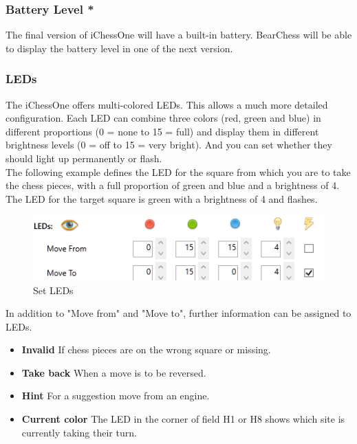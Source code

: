 \documentclass[11pt,a4paper]{article}
\begin{document}
\subsubsection{Battery Level {\color{red}\textbf{*}} }
 
The final version of iChessOne will have a built-in battery. BearChess will be able to display the battery level in one of the next version.

\subsubsection{LEDs}

The iChessOne offers multi-colored LEDs. This allows a much more detailed configuration. Each LED can combine three colors ({\color{red}red}, {\color{ForestGreen}green} and {\color{blue}blue}) in different proportions (0 = none to 15 = full) and display them in different brightness levels (0 = off to 15 = very bright).
And you can set whether they should light up permanently or flash.\\
The following example defines the LED for the square from which you are to take the chess pieces, with a full proportion of  {\color{ForestGreen}green} and {\color{blue}blue} and a brightness of 4.
The LED for the target square is {\color{ForestGreen}green} with a brightness of 4 and flashes.

\begin{figure}[H]
	\centering
	\includegraphics[scale=1.0]{iChessOne3.png}
	\caption{Set LEDs }
	\label{fig:iChessOne6}
\end{figure}
In addition to "Move from" and "Move to", further information can be assigned to LEDs.
\begin{itemize}
	\item \textbf{Invalid} If chess pieces are on the wrong square or missing.
	\item \textbf{Take back} When a move is to be reversed.
    \item \textbf{Hint} For a suggestion move from an engine.
    \item \textbf{Current color} The LED in the corner of field H1 or H8 shows which site is currently taking their turn.	       
\end{itemize}
\end{document}
